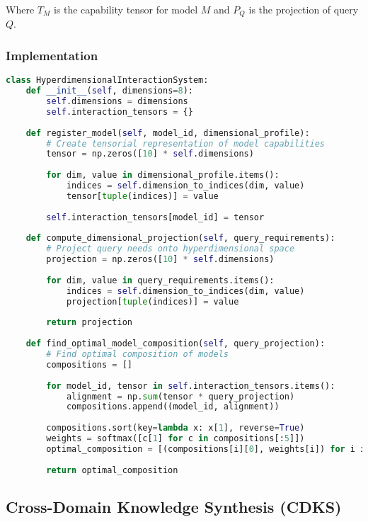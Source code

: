 \documentclass[journal,onecolumn]{IEEEtran}
\begin{document}
Where $T_M$ is the capability tensor for model $M$ and $P_Q$ is the projection of query $Q$.

\subsubsection{Implementation}

\begin{lstlisting}[language=Python, caption=HIT Implementation Pseudocode]
class HyperdimensionalInteractionSystem:
    def __init__(self, dimensions=8):
        self.dimensions = dimensions
        self.interaction_tensors = {}
    
    def register_model(self, model_id, dimensional_profile):
        # Create tensorial representation of model capabilities
        tensor = np.zeros([10] * self.dimensions)
        
        for dim, value in dimensional_profile.items():
            indices = self.dimension_to_indices(dim, value)
            tensor[tuple(indices)] = value
        
        self.interaction_tensors[model_id] = tensor
    
    def compute_dimensional_projection(self, query_requirements):
        # Project query needs onto hyperdimensional space
        projection = np.zeros([10] * self.dimensions)
        
        for dim, value in query_requirements.items():
            indices = self.dimension_to_indices(dim, value)
            projection[tuple(indices)] = value
            
        return projection
    
    def find_optimal_model_composition(self, query_projection):
        # Find optimal composition of models
        compositions = []
        
        for model_id, tensor in self.interaction_tensors.items():
            alignment = np.sum(tensor * query_projection)
            compositions.append((model_id, alignment))
            
        compositions.sort(key=lambda x: x[1], reverse=True)
        weights = softmax([c[1] for c in compositions[:5]])
        optimal_composition = [(compositions[i][0], weights[i]) for i in range(5)]
        
        return optimal_composition
\end{lstlisting}

\subsection{Cross-Domain Knowledge Synthesis (CDKS)}
\end{document}
